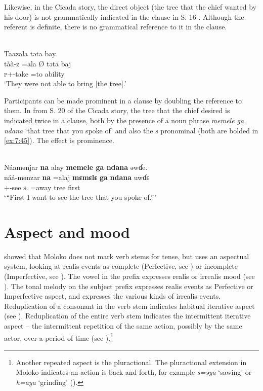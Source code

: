 Likewise, in the Cicada story, the direct object (the tree that the chief wanted by his door) is not grammatically indicated in the clause in S. 16 . Although the referent is definite, there is no grammatical reference to it in the clause. 


\ea\label{ex:7:44}\\
Taazala təta  bay. \\
\gll tàà-z =ala             Ø  təta    baj \\
\textsc{p}+{\HOR}-take =to   {}     ability  {\NEG}\\
\glt ‘They were not able to bring [the tree].’  
\z

Participants can be made prominent in a clause by doubling the reference to them. In  from S. 20 of the Cicada story, the tree that the chief desired is indicated twice in a clause, both by the presence of a noun phrase \textit{memele ga ndana} ‘that tree that you spoke of’ and also the \textsc{s} \DO pronominal (both are bolded in \ref{ex:7:45}). The effect is prominence. 


\ea\label{ex:7:45}\\
Náamənjar  \textbf{na}  alay  \textbf{memele  ga  ndana}  əwɗe.\\
\gll náá-mənzar    \textbf{na}  =alaj   \textbf{mɛmɛlɛ}  \textbf{ga}   \textbf{ndana}  uwɗɛ\\
{\oneS}+{\POT}-see   \textsc{s}.{\DO}  =away   tree   {\ADJ}  {\DEM}   first\\
\glt ‘“First I want to see the tree that you spoke of.”’
\z

\section{Aspect and mood}\label{sec:7.4}
\hypertarget{RefHeading1212201525720847}{}
\citet{FriesenMamalis2008} showed that Moloko does not mark verb stems for tense, but uses an aspectual system, looking at realis events as complete (Perfective, see ) or incomplete (Imperfective, see ). The vowel in the prefix expresses realis or irrealis mood (see ). The tonal melody on the subject prefix expresses realis events as Perfective or Imperfective aspect, and expresses the various kinds of irrealis events. Reduplication of a consonant in the verb stem indicates habitual iterative aspect (see ). Reduplication of the entire verb stem indicates the intermittent iterative aspect -- the intermittent repetition of the same action, possibly by the same actor, over a period of time (see ).\footnote{Another repeated aspect is the pluractional. The pluractional extension in Moloko indicates an action is back and forth, for example \textit{s=əya} ‘sawing’ or \textit{h=aya} ‘grinding’ ().}

